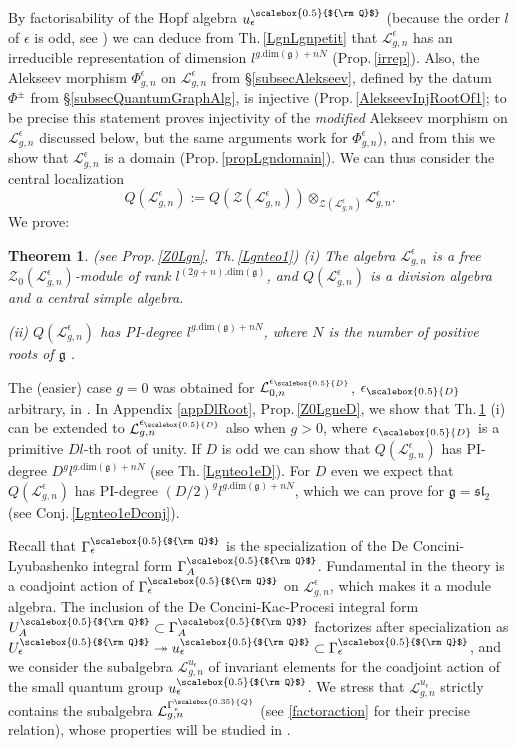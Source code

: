 \documentclass[11pt]{amsart}
\newtheorem{teo}{Theorem}[section]
\newcommand{\e}{\epsilon}
\newcommand{\Ll}{\mathcal{L}}
\newcommand{\eD}{\epsilon_{\scalebox{0.5}{D}}}
\newcommand{\Q}{{\scalebox{0.5}{${\rm Q}$}}}
\begin{document}
\smallskip

By factorisability of the Hopf algebra $u_\epsilon^\Q$ (because the order $l$ of $\e$ is odd, see \cite{Lyub95}) we can deduce from Th.\,\ref{LgnLgnpetit} that $\Ll_{g,n}^{\e}$ has an irreducible representation of dimension $l^{g.\mathrm{dim}(\mathfrak{g})+nN}$ (Prop.\,\ref{irrep}). Also, the Alekseev morphism $\Phi_{g,n}^\e$  on $\Ll_{g,n}^{\e}$ from \S \ref{subsecAlekseev}, defined by the datum $\Phi^\pm$ from \S \ref{subsecQuantumGraphAlg}, is injective (Prop.\,\ref{AlekseevInjRootOf1}; to be precise this statement proves injectivity of the {\it modified} Alekseev morphism on $\Ll_{g,n}^{\e}$ discussed below, but the same arguments work for $\Phi_{g,n}^\e$), and from this we show that $\Ll_{g,n}^{\e}$ is a domain (Prop.\,\ref{propLgndomain}). We can thus consider the central localization
$$Q(\Ll_{g,n}^\e) := Q(\mathcal{Z}(\Ll_{g,n}^\e))  \otimes_{\mathcal{Z}(\Ll_{g,n}^\e)} \Ll_{g,n}^\e.$$
We prove:
\begin{teo}\label{Lgn} {\rm (see Prop.\,\ref{Z0Lgn}, Th.\,\ref{Lgnteo1})} (i) The algebra $\Ll_{g,n}^{\e}$ is a free $\mathcal{Z}_0(\mathcal{L}_{g,n}^\e)$-module of rank $l^{(2g+n).\mathrm{dim}(\mathfrak{g})}$, and $Q(\Ll_{g,n}^{\e})$ is a division algebra and a central simple algebra.

\noindent (ii) $Q(\Ll_{g,n}^\e)$ has PI-degree $l^{g.\mathrm{dim}(\mathfrak{g})+nN}$, where $N$ is the number of positive roots of $\mathfrak{g}$ .
\end{teo}
The (easier) case $g=0$ was obtained for $\Ll_{0,n}^{\eD}$, $\eD$ arbitrary, in \cite[Th.\,4.9 and Th.\,5.2]{BR2}. In Appendix \ref{appDlRoot}, Prop.\,\ref{Z0LgneD}, we show that Th.\,\ref{Lgn} (i) can be extended to $\Ll_{g,n}^{\eD}$ also when $g>0$, where $\eD$ is a primitive $Dl$-th root of unity. If $D$ is odd we can show that $Q(\Ll_{g,n}^\e)$ has PI-degree $D^gl^{g.\mathrm{dim}(\mathfrak{g})+nN}$ (see Th.\,\ref{Lgnteo1eD}). For $D$ even we expect that $Q(\Ll_{g,n}^\e)$ has PI-degree $(D/2)^gl^{g.\mathrm{dim}(\mathfrak{g})+nN}$, which we can prove for $\mathfrak{g}=\mathfrak{sl}_2$ (see Conj.\,\ref{Lgnteo1eDconj}).
\smallskip

Recall that $\Gamma_\e^\Q$ is the specialization of the De Concini-Lyubashenko integral form $\Gamma_A^\Q$. Fundamental in the theory is a coadjoint action of $\Gamma^\Q_\e$ on $\Ll_{g,n}^\e$, which makes it a module algebra. The inclusion of the De Concini-Kac-Procesi integral form $U_A^\Q \subset \Gamma_A^\Q$ factorizes after specialization as $U_\e^\Q \twoheadrightarrow u_\e^\Q \subset \Gamma_\e^\Q$, and we consider the subalgebra $\mathcal{L}_{g,n}^{u_\e}$ of invariant elements for the coadjoint action of the small quantum group $u_\e^\Q$. We stress that $\mathcal{L}_{g,n}^{u_\e}$ strictly contains the subalgebra $\mathcal{L}_{g,n}^{\Gamma_\e^{{\scalebox{0.35}{Q}}}}$ (see \eqref{factoraction} for their precise relation), whose properties will be studied in \cite{BF}. 
\end{document}
